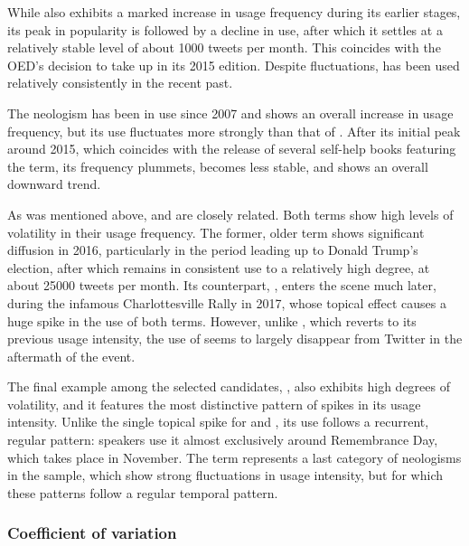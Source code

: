 \documentclass[
  a4paper,
  abstract=on,
  captions=tableabove
  ]{scrartcl}
\begin{document}
        While  also exhibits a marked increase in usage frequency during its earlier stages, its peak in popularity is followed by a decline in use, after which it settles at a relatively stable level of about \num{1000} tweets per month. This coincides with the OED's decision to take up  in its 2015 edition. Despite fluctuations,  has been used relatively consistently in the recent past.

        The neologism  has been in use since 2007 and shows an overall increase in usage frequency, but its use fluctuates more strongly than that of . After its initial peak around 2015, which coincides with the release of several self-help books featuring the term, its frequency plummets, becomes less stable, and shows an overall downward trend.

        As was mentioned above,  and  are closely related. Both terms show high levels of volatility in their usage frequency. The former, older term shows significant diffusion in 2016, particularly in the period leading up to Donald Trump's election, after which  remains in consistent use to a relatively high degree, at about \num{25000} tweets per month. Its counterpart, , enters the scene much later, during the infamous Charlottesville Rally in 2017, whose topical effect causes a huge spike in the use of both terms. However, unlike , which reverts to its previous usage intensity, the use of  seems to largely disappear from Twitter in the aftermath of the event.

        The final example among the selected candidates, , also exhibits high degrees of volatility, and it features the most distinctive pattern of spikes in its usage intensity. Unlike the single topical spike for  and , its use follows a recurrent, regular pattern: speakers use it almost exclusively around Remembrance Day, which takes place in November. The term  represents a last category of neologisms in the sample, which show strong fluctuations in usage intensity, but for which these patterns follow a regular temporal pattern. 


    \subsubsection{Coefficient of variation}
      \label{subsubsec:coef-var}
\end{document}
